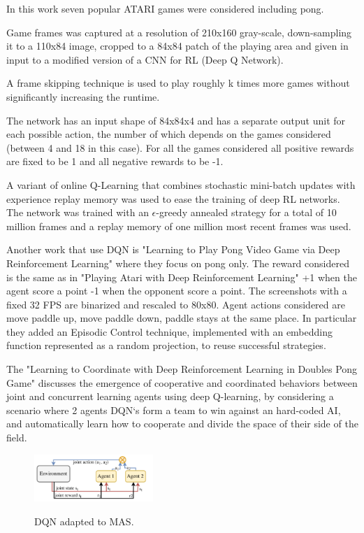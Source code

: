 In this work seven popular ATARI games were considered including pong.

Game frames was captured at a resolution of 210x160 gray-scale, down-sampling it to a 110x84 image, cropped to a 84x84 patch of the playing area
and given in input to a modified version of a CNN for RL (Deep Q Network).

A frame skipping technique is used to play roughly k times more games without significantly increasing the runtime.

The network has an input shape of 84x84x4 and has a separate output unit for each possible action, the number of which depends on the games considered (between 4 and 18 in this case).
For all the games considered all positive rewards are fixed to be 1 and all negative rewards to be -1.

A variant of online Q-Learning that combines stochastic mini-batch updates with experience replay memory was used to ease the training of deep RL networks.
The network was trained with an $\epsilon$-greedy annealed strategy for a total of 10 million frames and a replay memory of one million most recent frames was used.




Another work that use DQN is "Learning to Play Pong Video Game via Deep Reinforcement Learning" where they focus on pong only.
The reward considered is the same as in "Playing Atari with Deep Reinforcement Learning" +1 when the agent score a point -1 when the opponent score a point.
The screenshots with a fixed 32 FPS are binarized and rescaled to 80x80.
Agent actions considered are move paddle up, move paddle down, paddle stays at the same place.
In particular they added an Episodic Control technique, implemented with an embedding function represented as a random projection, to reuse successful strategies.




The "Learning to Coordinate with Deep Reinforcement Learning in Doubles Pong Game" discusses the emergence of cooperative and coordinated behaviors between joint and concurrent learning
agents using deep Q-learning, by considering a scenario where 2 agents DQN`s form a team to win against an hard-coded AI,
and automatically learn how to cooperate and divide the space of their side of the field.

\begin{figure}[ht]
    \centering
    \includegraphics[width=0.4\textwidth]{images/DQN_MAS.png}
    \label{dqnmas}
    \caption{DQN adapted to MAS.}
\end{figure}

